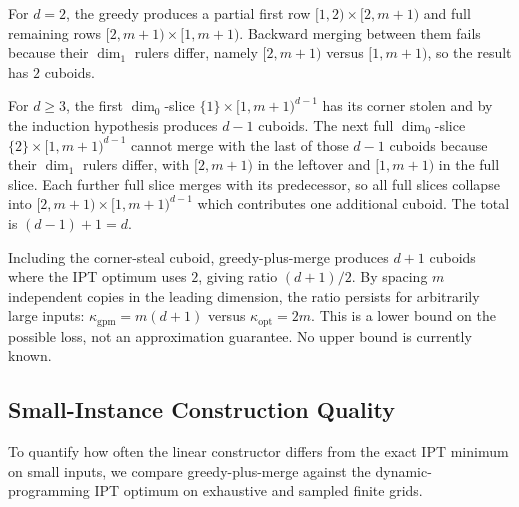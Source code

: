 \documentclass[manuscript,screen,review]{acmart}
\theoremstyle{definition}
\theoremstyle{plain}
\begin{document}
For $d = 2$, the greedy produces a partial first row
$
  [1,2){\times}[2,m{+}1)
$
and full remaining rows
$  [2,m{+}1){\times}[1,m{+}1)$.
Backward merging between them fails because their $\dim_1$ rulers differ,
namely $[2,m{+}1)$ versus $[1,m{+}1)$, so the result has $2$ cuboids.

For $d \geq 3$, the first $\dim_0$-slice $\{1\}{\times}[1,m{+}1)^{d-1}$
has its corner stolen and by the induction hypothesis produces $d - 1$
cuboids. The next full $\dim_0$-slice
$
  \{2\}{\times}[1,m{+}1)^{d-1}
$
cannot merge with the last of those $d - 1$ cuboids because their $\dim_1$
rulers differ, with $[2,m{+}1)$ in the leftover and $[1,m{+}1)$ in the
full slice. Each further full slice merges with its predecessor, so all
full slices collapse into
$[2,m{+}1){\times}[1,m{+}1)^{d-1}$
which contributes one additional cuboid. The total is $(d-1)+1 = d$.

Including the corner-steal cuboid, greedy-plus-merge produces $d + 1$
cuboids where the IPT optimum uses $2$, giving ratio $(d+1)/2$. By spacing
$m$ independent copies in the leading dimension, the ratio persists
for arbitrarily large inputs: $\kappa_{\mathrm{gpm}} = m(d+1)$ versus
$\kappa_{\mathrm{opt}} = 2m$. This is a lower bound on the possible
loss, not an approximation guarantee. No upper bound is currently
known.

\subsection{Small-Instance Construction Quality}
\label{section:results-construction-quality}

To quantify how often the linear constructor differs from the exact
IPT minimum on small inputs, we compare greedy-plus-merge against the
dynamic-programming IPT optimum on exhaustive and sampled finite grids.

\begin{table}[ht]

\caption{Small-instance comparison of greedy-plus-merge against the
exact dynamic-programming IPT optimum. The overhead is
$\kappa_{\mathrm{gpm}}/\kappa_{\mathrm{opt}} - 1$, reported in per
cent. The sampled rows use fixed pseudo-random seeds.}
\label{table:dynamic-programming-quality}
\end{table}
\end{document}
